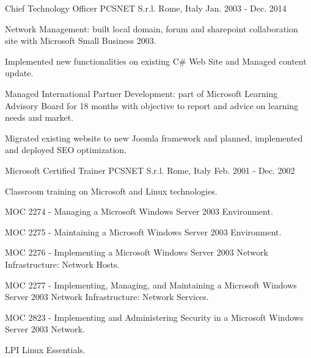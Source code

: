 \begin{cventries}
  \cventry
    {Chief Technology Officer} %
    {PCSNET S.r.l.} %
    {Rome, Italy} %
    {Jan. 2003 - Dec. 2014} %
    {
      \begin{cvitems} %
        \item {Network Management: built local domain, forum and sharepoint collaboration site with Microsoft Small Business 2003.}
        \item {Implemented new functionalities on existing C\# Web Site and Managed content update.}
        \item {Managed International Partner Development: part of Microsoft Learning Advisory Board for 18 months with objective to report and advice on learning needs and market.}
        \item {Migrated existing website to new Joomla framework and planned, implemented and deployed SEO optimization.}
      \end{cvitems}
    }

  \cventry
    {Microsoft Certified Trainer} %
    {PCSNET S.r.l.} %
    {Rome, Italy} %
    {Feb. 2001 - Dec. 2002} %
    {
      \begin{cvitems} %
        \item {Classroom training on Microsoft and Linux technologies.}
        \item {MOC 2274 - Managing a Microsoft Windows Server 2003 Environment.}
        \item {MOC 2275 - Maintaining a Microsoft Windows Server 2003 Environment.}
        \item {MOC 2276 - Implementing a Microsoft Windows Server 2003 Network Infrastructure: Network Hosts.}
        \item {MOC 2277 - Implementing, Managing, and Maintaining a Microsoft Windows Server 2003 Network Infrastructure: Network Services.}
        \item {MOC 2823 - Implementing and Administering Security in a Microsoft Windows Server 2003 Network.}
        \item {LPI Linux Essentials.}
      \end{cvitems}
    }

\end{cventries}
